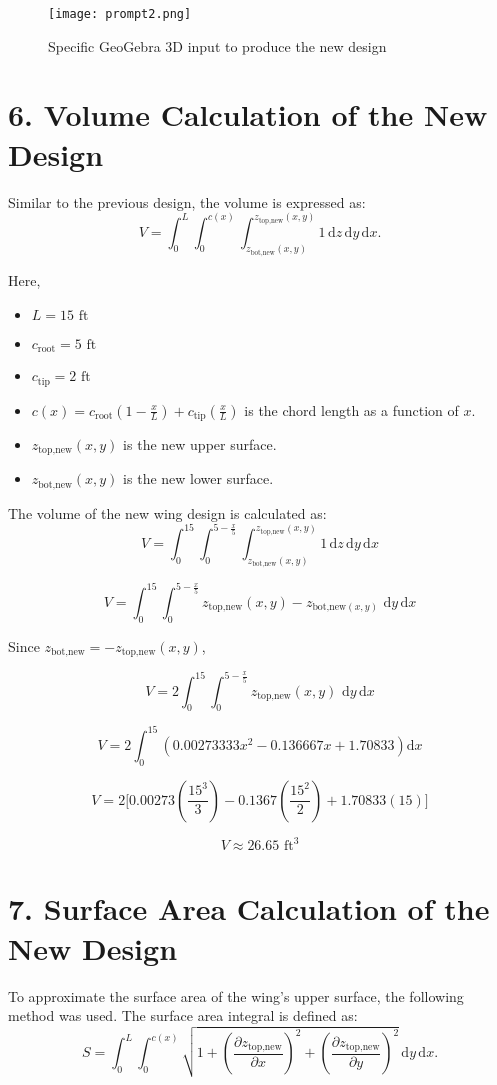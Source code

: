 \documentclass[12pt]{article}
\begin{document}
\begin{figure}[H]
    \centering
    \texttt{[image: prompt2.png]}
    \caption{Specific GeoGebra 3D input to produce the new design}
    \label{fig:4}
\end{figure}

\section*{6. Volume Calculation of the New Design}
Similar to the previous design, the volume is expressed as:
\[
V = \int_{0}^L \int_{0}^{c(x)} \int_{z_{\text{bot,new}}(x, y)}^{z_{\text{top,new}}(x, y)} 1 \, \mathrm{d}z \, \mathrm{d}y \, \mathrm{d}x.
\]

Here, 
\begin{itemize}
    \item \( L = 15 \text{ ft} \) 
    \item \( c_{\text{root}} = 5 \text{ ft}\)
    \item \( c_{\text{tip}} = 2 \text{ ft}\)
    \item \( c(x) = c_{\text{root}} \left( 1 - \frac{x}{L} \right) + c_{\text{tip}} \left( \frac{x}{L} \right) \) is the chord length as a function of \( x \).
    \item \( z_{\text{top,new}}(x, y) \) is the new upper surface.
    \item \( z_{\text{bot,new}}(x, y) \) is the new lower surface.
\end{itemize}



The volume of the new wing design is calculated as:
\[
V = \int_{0}^{15} \int_{0}^{5 - \frac{x}{5}} \int_{ z_{\text{bot,new}}(x, y)}^{ z_{\text{top,new}}(x, y)} 1 \, \mathrm{d}z \, \mathrm{d}y \, \mathrm{d}x
\]

\[
V = \int_{0}^{15} \int_{0}^{5 - \frac{x}{5}} z_{\text{top,new}}(x, y) - z_{\text{bot,new}(x, y)} \,  \, \mathrm{d}y \, \mathrm{d}x
\]

Since $z_{\text{bot,new}} = -z_{\text{top,new}}(x, y)$, 

\[
V = 2 \int_{0}^{15} \int_{0}^{5 - \frac{x}{5}} z_{\text{top,new}}(x, y)  \,  \, \mathrm{d}y \, \mathrm{d}x
\]

\[
V = 2 \int_{0}^{15} (0.00273333x^2-0.136667x + 1.70833)\mathrm{d}x
\]

\[ V = 2\Bigg[ 0.00273\left(\frac{15^3}{3}\right) - 0.1367\left(\frac{15^2}{2}\right) + 1.70833(15)\Bigg]\]


\[V \approx 26.65 \text{ ft}^3\]
\section*{7. Surface Area Calculation of the New Design}
To approximate the surface area of the wing's upper surface, the following method was used. The surface area integral is defined as:
\[
S= \int_{0}^{L} \int_{0}^{c(x)} \sqrt{1 + \left(\frac{\partial z_{\text{top,new}}}{\partial x}\right)^2 + \left(\frac{\partial z_{\text{top,new}}}{\partial y}\right)^2} \, \mathrm{d}y \, \mathrm{d}x.
\]
\end{document}
